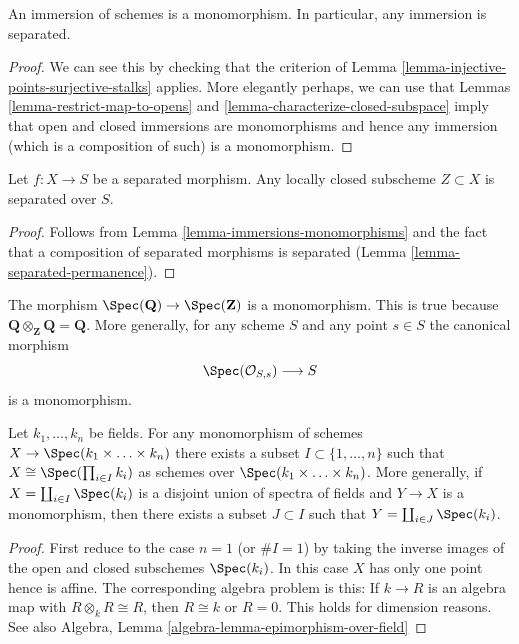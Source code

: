 \begin{lemma}
\label{lemma-immersions-monomorphisms}
An immersion of schemes is a monomorphism.
In particular, any immersion is separated.
\end{lemma}

\begin{proof}
We can see this by checking that the criterion of
Lemma \ref{lemma-injective-points-surjective-stalks} applies.
More elegantly perhaps, we can use that
Lemmas \ref{lemma-restrict-map-to-opens} and
\ref{lemma-characterize-closed-subspace} imply that
open and closed immersions are monomorphisms and hence
any immersion (which is a composition of such)
is a monomorphism.
\end{proof}

\begin{lemma}
\label{lemma-subscheme-of-separated-scheme}
Let $f : X \to S$ be a separated morphism.
Any locally closed subscheme $Z \subset X$ is separated over $S$.
\end{lemma}

\begin{proof}
Follows from Lemma \ref{lemma-immersions-monomorphisms}
and the fact that a composition of separated morphisms is separated
(Lemma \ref{lemma-separated-permanence}).
\end{proof}

\begin{example}
\label{example-Q-over-Z}
The morphism $\Spec(\mathbf{Q}) \to \Spec(\mathbf{Z})$
is a monomorphism. This is true because
$\mathbf{Q} \otimes_{\mathbf{Z}} \mathbf{Q} = \mathbf{Q}$.
More generally, for any scheme $S$ and any point $s \in S$ the
canonical morphism
$$
\Spec(\mathcal{O}_{S, s}) \longrightarrow S
$$
is a monomorphism.
\end{example}

\begin{lemma}
\label{lemma-mono-towards-spec-field}
Let $k_1, \ldots, k_n$ be fields.
For any monomorphism of schemes
$X \to \Spec(k_1 \times \ldots \times k_n)$
there exists a subset $I \subset \{1, \ldots, n\}$ such
that $X \cong \Spec(\prod_{i \in I} k_i)$ as
schemes over $\Spec(k_1 \times \ldots \times k_n)$.
More generally, if $X = \coprod_{i \in I} \Spec(k_i)$
is a disjoint union of spectra of fields and $Y \to X$ is a monomorphism,
then there exists a subset $J \subset I$ such that
$Y = \coprod_{i \in J} \Spec(k_i)$.
\end{lemma}

\begin{proof}
First reduce to the case $n = 1$ (or $\# I = 1$)
by taking the inverse images of the
open and closed subschemes $\Spec(k_i)$.
In this case $X$ has only one point hence is affine.
The corresponding algebra problem is this:
If $k \to R$ is an algebra map
with $R \otimes_k R \cong R$, then $R \cong k$ or $R = 0$.
This holds for dimension reasons.
See also
Algebra, Lemma \ref{algebra-lemma-epimorphism-over-field}
\end{proof}











